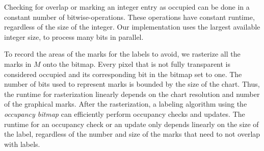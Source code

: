 Checking for overlap or marking an integer entry as occupied can be done in a constant number of bitwise-operations.
These operations have constant runtime, regardless of the size of the integer.
Our implementation uses the largest available integer size, to process many bits in parallel.

To record the areas of the marks for the labels to avoid, we rasterize all the marks in $M$ onto
the bitmap.
Every pixel that is not fully transparent is considered occupied and its corresponding bit in the bitmap set to one.
The number of bits used to represent marks is bounded by the size of the chart.
Thus, the runtime for rasterization linearly depends on the chart resolution and number of the graphical marks.
After the rasterization, a labeling algorithm using the \emph{occupancy bitmap} can efficiently perform occupancy checks and updates.
The runtime for an occupancy check or an update only depends linearly on the size of the label,
regardless of the number and size of the marks that need to not overlap with labels.